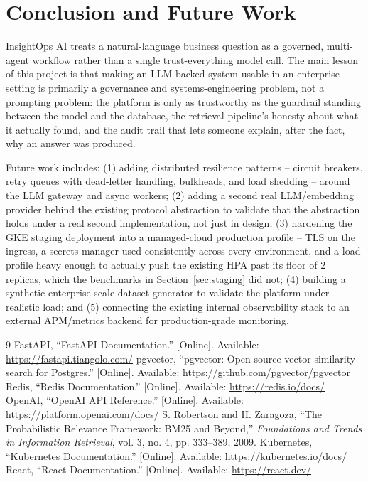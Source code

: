 \documentclass[conference]{IEEEtran}
\begin{document}
\section{Conclusion and Future Work}

InsightOps AI treats a natural-language business question as a governed,
multi-agent workflow rather than a single trust-everything model call. The
main lesson of this project is that making an LLM-backed system usable in
an enterprise setting is primarily a governance and systems-engineering
problem, not a prompting problem: the platform is only as trustworthy as
the guardrail standing between the model and the database, the retrieval
pipeline's honesty about what it actually found, and the audit trail that
lets someone explain, after the fact, why an answer was produced.

Future work includes: (1) adding distributed resilience patterns --
circuit breakers, retry queues with dead-letter handling, bulkheads, and
load shedding -- around the LLM gateway and async workers; (2) adding a
second real LLM/embedding provider behind the existing protocol
abstraction to validate that the abstraction holds under a real second
implementation, not just in design; (3) hardening the GKE staging
deployment into a managed-cloud production profile -- TLS on the ingress,
a secrets manager used consistently across every environment, and a load
profile heavy enough to actually push the existing HPA past its floor of
2 replicas, which the benchmarks in Section~\ref{sec:staging} did not; (4)
building a synthetic enterprise-scale dataset generator to validate the
platform under realistic load; and (5) connecting the existing internal
observability stack to an external APM/metrics backend for
production-grade monitoring.

\begin{thebibliography}{9}
 FastAPI, ``FastAPI Documentation.'' [Online]. Available: \url{https://fastapi.tiangolo.com/}
 pgvector, ``pgvector: Open-source vector similarity search for Postgres.'' [Online]. Available: \url{https://github.com/pgvector/pgvector}
 Redis, ``Redis Documentation.'' [Online]. Available: \url{https://redis.io/docs/}
 OpenAI, ``OpenAI API Reference.'' [Online]. Available: \url{https://platform.openai.com/docs/}
 S. Robertson and H. Zaragoza, ``The Probabilistic Relevance Framework: BM25 and Beyond,'' \emph{Foundations and Trends in Information Retrieval}, vol. 3, no. 4, pp. 333--389, 2009.
 Kubernetes, ``Kubernetes Documentation.'' [Online]. Available: \url{https://kubernetes.io/docs/}
 React, ``React Documentation.'' [Online]. Available: \url{https://react.dev/}
\end{thebibliography}
\end{document}
